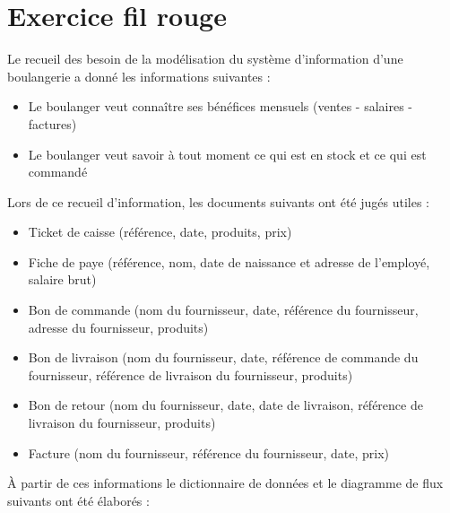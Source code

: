 \section*{Exercice fil rouge}

Le recueil des besoin de la modélisation du système d'information d'une boulangerie a donné les informations suivantes :

\begin{itemize}
    \item Le boulanger veut connaître ses bénéfices mensuels (ventes - salaires - factures)
    \item Le boulanger veut savoir à tout moment ce qui est en stock et ce qui est commandé\\
\end{itemize}

Lors de ce recueil d'information, les documents suivants ont été jugés utiles :

\begin{itemize}
    \item Ticket de caisse (référence, date, produits, prix)
    \item Fiche de paye (référence, nom, date de naissance et adresse de l'employé, salaire brut)
    \item Bon de commande (nom du fournisseur, date, référence du fournisseur, adresse du fournisseur, produits)
    \item Bon de livraison (nom du fournisseur, date, référence de commande du fournisseur, référence de livraison du fournisseur, produits)
    \item Bon de retour (nom du fournisseur, date, date de livraison, référence de livraison du fournisseur, produits)
    \item Facture (nom du fournisseur, référence du fournisseur, date, prix) \\
\end{itemize}

À partir de ces informations le dictionnaire de données et le diagramme de flux suivants ont été élaborés :\\


